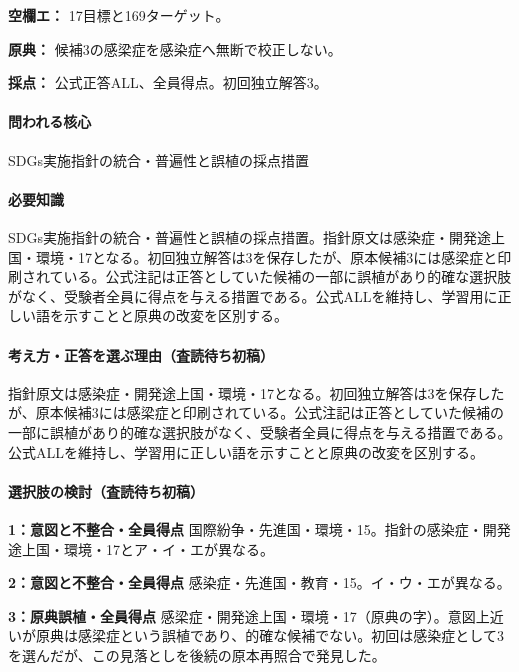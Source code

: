 \noindent\textbf{空欄エ：} 17目標と169ターゲット。\par

\noindent\textbf{原典：} 候補3の感梁症を感染症へ無断で校正しない。\par

\noindent\textbf{採点：} 公式正答ALL、全員得点。初回独立解答3。\par

\paragraph{問われる核心} SDGs実施指針の統合・普遍性と誤植の採点措置

\paragraph{必要知識} SDGs実施指針の統合・普遍性と誤植の採点措置。指針原文は感染症・開発途上国・環境・17となる。初回独立解答は3を保存したが、原本候補3には感梁症と印刷されている。公式注記は正答としていた候補の一部に誤植があり的確な選択肢がなく、受験者全員に得点を与える措置である。公式ALLを維持し、学習用に正しい語を示すことと原典の改変を区別する。

\paragraph{考え方・正答を選ぶ理由（査読待ち初稿）} 指針原文は感染症・開発途上国・環境・17となる。初回独立解答は3を保存したが、原本候補3には感梁症と印刷されている。公式注記は正答としていた候補の一部に誤植があり的確な選択肢がなく、受験者全員に得点を与える措置である。公式ALLを維持し、学習用に正しい語を示すことと原典の改変を区別する。

\paragraph{選択肢の検討（査読待ち初稿）}\mbox{}\par

\noindent\textbf{1：意図と不整合・全員得点} 国際紛争・先進国・環境・15。指針の感染症・開発途上国・環境・17とア・イ・エが異なる。\par

\noindent\textbf{2：意図と不整合・全員得点} 感染症・先進国・教育・15。イ・ウ・エが異なる。\par

\noindent\textbf{3：原典誤植・全員得点} 感梁症・開発途上国・環境・17（原典の字）。意図上近いが原典は感梁症という誤植であり、的確な候補でない。初回は感染症として3を選んだが、この見落としを後続の原本再照合で発見した。\par

